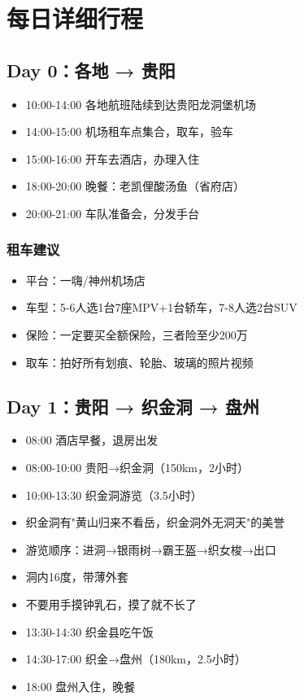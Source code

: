\documentclass[12pt,a4paper,UTF8]{ctexart}
\begin{document}
\newpage

\section{每日详细行程}

\subsection{Day 0：各地 → 贵阳}
\begin{itemize}
\item 10:00-14:00 各地航班陆续到达贵阳龙洞堡机场
\item 14:00-15:00 机场租车点集合，取车，验车
\item 15:00-16:00 开车去酒店，办理入住
\item 18:00-20:00 晚餐：老凯俚酸汤鱼（省府店）
\item 20:00-21:00 车队准备会，分发手台
\end{itemize}

\subsubsection{租车建议}
\begin{itemize}
\item 平台：一嗨/神州机场店
\item 车型：5-6人选1台7座MPV+1台轿车，7-8人选2台SUV
\item 保险：一定要买全额保险，三者险至少200万
\item 取车：拍好所有划痕、轮胎、玻璃的照片视频
\end{itemize}

\subsection{Day 1：贵阳 → 织金洞 → 盘州}
\begin{itemize}
\item 08:00 酒店早餐，退房出发
\item 08:00-10:00 贵阳→织金洞（150km，2小时）
\item 10:00-13:30 织金洞游览（3.5小时）
\item 织金洞有"黄山归来不看岳，织金洞外无洞天"的美誉
\item 游览顺序：进洞→银雨树→霸王盔→织女梭→出口
\item 洞内16度，带薄外套
\item 不要用手摸钟乳石，摸了就不长了
\item 13:30-14:30 织金县吃午饭
\item 14:30-17:00 织金→盘州（180km，2.5小时）
\item 18:00 盘州入住，晚餐
\end{itemize}
\end{document}
